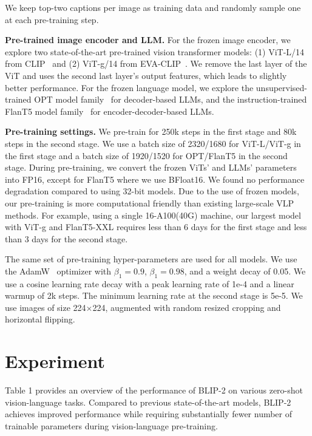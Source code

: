 We keep top-two captions per image as training data and randomly sample one at each pre-training step.

\textbf{Pre-trained image encoder and LLM.} For the frozen image encoder, we explore two state-of-the-art pre-trained vision transformer models: (1) ViT-L/14 from CLIP~\cite{clip} and (2) ViT-g/14 from EVA-CLIP~\cite{eva}. We remove the last layer of the ViT and uses the second last layer's output features, which leads to slightly better performance. For the frozen language model, we explore the unsupervised-trained OPT model family~\cite{opt} for decoder-based LLMs, and the instruction-trained FlanT5 model family~\cite{flanT5} for encoder-decoder-based LLMs.

\textbf{Pre-training settings.} We pre-train for 250k steps in the first stage and 80k steps in the second stage. We use a batch size of 2320/1680 for ViT-L/ViT-g in the first stage and a batch size of 1920/1520 for OPT/FlanT5 in the second stage. During pre-training, we convert the frozen ViTs' and LLMs' parameters into FP16, except for FlanT5 where we use BFloat16. We found no performance degradation compared to using 32-bit models. Due to the use of frozen models, our pre-training is more computational friendly than existing large-scale VLP methods. For example, using a single 16-A100(40G) machine, our largest model with ViT-g and FlanT5-XXL requires less than 6 days for the first stage and less than 3 days for the second stage.

The same set of pre-training hyper-parameters are used for all models. We use the AdamW~\cite{adamw} optimizer with $\beta_1=0.9$, $\beta_1=0.98$, and a weight decay of 0.05. We use a cosine learning rate decay with a peak learning rate of 1e-4 and a linear warmup of 2k steps. The minimum learning rate at the second stage is 5e-5. We use images of size 224$\times$224, augmented with random resized cropping and horizontal flipping.

\section{Experiment}

\label{sec:experiment}

Table 1 provides an overview of the performance of BLIP-2 on various zero-shot vision-language tasks. Compared to previous state-of-the-art models, BLIP-2 achieves improved performance while requiring substantially fewer number of trainable parameters during vision-language pre-training.

